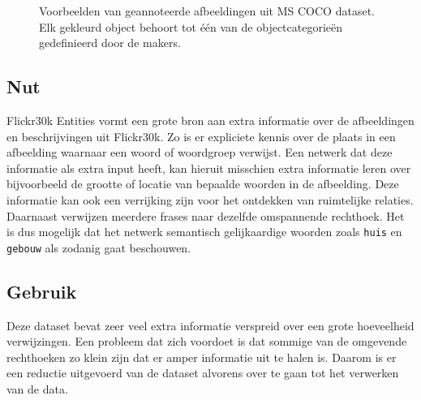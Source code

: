 \begin{figure}
    \centering
    \hfill
    \caption{Voorbeelden van geannoteerde afbeeldingen uit MS COCO dataset. Elk gekleurd object behoort tot \'e\'en van de objectcategorie\"en gedefinieerd door de makers.}
    \label{fig:cocoexamples}
\end{figure}

\subsection{Nut}
Flickr30k Entities vormt een grote bron aan extra informatie over de afbeeldingen en beschrijvingen uit Flickr30k. Zo is er expliciete kennis over de plaats in een afbeelding waarnaar een woord of woordgroep verwijst. Een netwerk dat deze informatie als extra input heeft, kan hieruit misschien extra informatie leren over bijvoorbeeld de grootte of locatie van bepaalde woorden in de afbeelding. Deze informatie kan ook een verrijking zijn voor het ontdekken van ruimtelijke relaties. Daarnaast verwijzen meerdere frases naar dezelfde omspannende rechthoek. Het is dus mogelijk dat het netwerk semantisch gelijkaardige woorden zoals \texttt{huis} en \texttt{gebouw} als zodanig gaat beschouwen.


\subsection{Gebruik}
\label{sub:Gebruik}
Deze dataset bevat zeer veel extra informatie verspreid over een grote hoeveelheid verwijzingen. Een probleem dat zich voordoet is dat sommige van de omgevende rechthoeken zo klein zijn dat er amper informatie uit te halen is. Daarom is er een reductie uitgevoerd van de dataset alvorens over te gaan tot het verwerken van de data. 

